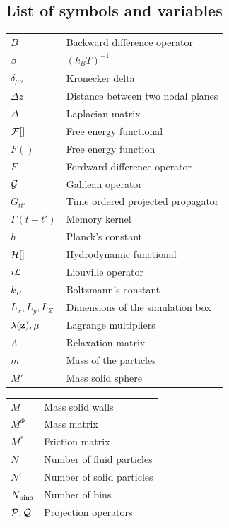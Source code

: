 \documentclass[b5paper,openright,10pt]{book}
\begin{document}
\begin{appendices}
\chapter{List of symbols and variables}

\begin{tabular}{l l}
    $B$ & Backward difference operator \\
    $\beta$ & $(k_BT)^{-1}$ \\
    $\delta_{\mu\nu}$ & Kronecker delta \\
    $\Delta z$ & Distance between two nodal planes \\
    $\Delta$ & Laplacian matrix \\
    ${\cal F}[]$ & Free energy functional \\
    $F()$ & Free energy function \\
    $F$ & Fordward difference operator \\
    ${\cal G}$ & Galilean operator \\
    $G_{tt'}$ & Time ordered projected propagator \\
    $\Gamma(t-t')$ & Memory kernel \\
    $h$ & Planck's constant \\
    ${\cal H}[]$ & Hydrodynamic functional \\
    $i{\cal L}$ & Liouville operator \\ 
    $k_B$ & Boltzmann's constant \\
    $L_x, L_y, L_Z$ & Dimensions of the simulation box \\
    $\lambda({\bf z}), \mu$ & Lagrange multipliers \\
    $\Lambda$ & Relaxation matrix\\
    $m$ & Mass of the particles \\
    $M'$ & Mass solid sphere \\
\end{tabular}
  \newpage
  \begin{tabular}{l l}
    $M$ & Mass solid walls \\
    $M^{\Phi}$ & Mass matrix \\
    $M^*$ & Friction matrix \\
    $N$ & Number of fluid particles \\
    $N'$ & Number of solid particles \\
    $N_{\rm bins}$ & Number of bins \\
    ${\cal P}, {\cal Q}$ & Projection operators \\

\end{tabular}
\end{appendices}
\end{document}
